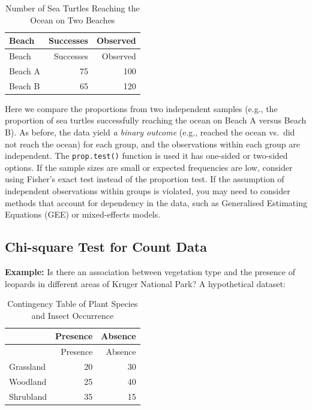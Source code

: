 \documentclass[
  letterpaper,
]{book}
\begin{document}
\begin{longtable}[]{@{}lrr@{}}
\caption{Number of Sea Turtles Reaching the Ocean on Two
Beaches}\tabularnewline
\toprule\noalign{}
Beach & Successes & Observed \\
\midrule\noalign{}
\endfirsthead
\toprule\noalign{}
Beach & Successes & Observed \\
\midrule\noalign{}
\endhead
\bottomrule\noalign{}
\endlastfoot
Beach A & 75 & 100 \\
Beach B & 65 & 120 \\
\end{longtable}

Here we compare the proportions from two independent samples (e.g., the
proportion of sea turtles successfully reaching the ocean on Beach A
versus Beach B). As before, the data yield \emph{a binary outcome}
(e.g., reached the ocean vs.~did not reach the ocean) for each group,
and the observations within each group are independent. The
\texttt{prop.test()} function is used it has one-sided or two-sided
options. If the sample sizes are small or expected frequencies are low,
consider using Fisher's exact test instead of the proportion test. If
the assumption of independent observations within groups is violated,
you may need to consider methods that account for dependency in the
data, such as Generalised Estimating Equations (GEE) or mixed-effects
models.

\subsection{Chi-square Test for Count
Data}\label{chi-square-test-for-count-data}

\textbf{Example:} Is there an association between vegetation type and
the presence of leopards in different areas of Kruger National Park? A
hypothetical dataset:

\begin{longtable}[]{@{}lrr@{}}
\caption{Contingency Table of Plant Species and Insect
Occurrence}\tabularnewline
\toprule\noalign{}
& Presence & Absence \\
\midrule\noalign{}
\endfirsthead
\toprule\noalign{}
& Presence & Absence \\
\midrule\noalign{}
\endhead
\bottomrule\noalign{}
\endlastfoot
Grassland & 20 & 30 \\
Woodland & 25 & 40 \\
Shrubland & 35 & 15 \\
\end{longtable}
\end{document}
